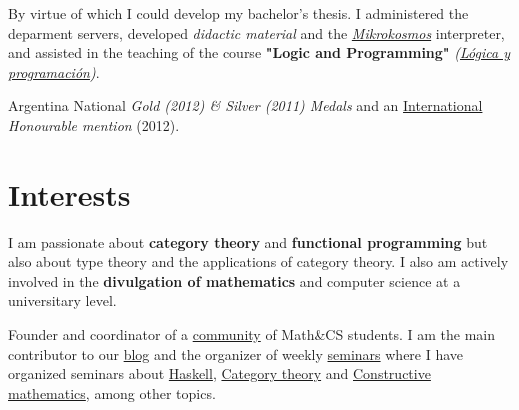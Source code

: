\documentclass[nocolors]{friggeri-cv-a4}
\begin{document}
\begin{entrylist}

   {By virtue of which I could develop my
    bachelor's thesis. I administered the deparment servers, developed
    \textit{didactic material} and the \textit{\href{https://github.com/mroman42/mikrokosmos}{Mikrokosmos}}
    interpreter, and assisted in the teaching of the course
    \textbf{"Logic and Programming"} \textit{(\href{http://grados.ugr.es/informatica/pages/infoacademica/guias_docentes/201516/cuarto/ingenieriadelsoftware/complementos/logicayprogramacion/!}{Lógica y programación})}.  }

  
{Argentina}
{National \emph{Gold (2012) \& Silver (2011) Medals} and an
  \href{https://www.imo-official.org/team_r.aspx?code=ESP&year=2012}{International} \emph{Honourable mention} (2012).}


\end{entrylist}

\section{Interests}

I am passionate about \textbf{category theory} and \textbf{functional
  programming} but also about type theory and the applications of
category theory. I also am actively involved in the
\textbf{divulgation of mathematics} and computer science at a
universitary level.

\begin{entrylist}
  { Founder and coordinator of a
    \href{http://libreim.github.io/}{community} of Math\&CS students.
    I am the main contributor to our
    \href{http://libreim.github.io/blog/}{blog} and the organizer of
    weekly
    \href{http://libreim.github.io/dgiim/awesome/seminars/}{seminars}
    where I have organized seminars about
    \href{https://github.com/libreim/haskell}{Haskell},
    \href{https://github.com/libreim/introCategorias/blob/master/categorias.pdf}{Category
      theory} and
    \href{https://github.com/mroman42/libreim-constructiva/blob/master/constructiva.pdf}{Constructive mathematics}, among other topics.}
\end{entrylist}
\end{document}
